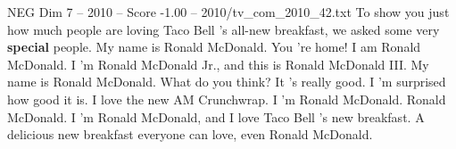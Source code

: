 \begin{textsample}{NEG Dim 7 – 2010 – Score -1.00 – 2010/tv\_com\_2010\_42.txt}  \label{ex:f7_neg_021}
To show you just how much people are loving Taco Bell 's all-new breakfast, we asked some very \textbf{special} people.
My name is Ronald McDonald.
You 're home!
I am Ronald McDonald.
I 'm Ronald McDonald Jr., and this is Ronald McDonald III.
My name is Ronald McDonald.
What do you think?
It 's really good.
I 'm surprised how good it is.
I love the new AM Crunchwrap.
I 'm Ronald McDonald.
Ronald McDonald.
I 'm Ronald McDonald, and I love Taco Bell 's new breakfast.
A delicious new breakfast everyone can love, even Ronald McDonald.

\end{textsample}
